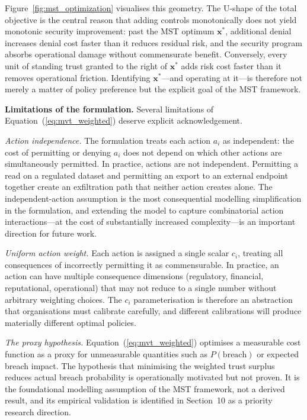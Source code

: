 \documentclass[acmlarge]{acmart}
\begin{document}
Figure~\ref{fig:mst_optimization} visualises this geometry. The U-shape of
the total objective is the central reason that adding controls monotonically
does not yield monotonic security improvement: past the MST optimum
$\mathbf{x}^*$, additional denial increases denial cost faster than it
reduces residual risk, and the security program absorbs operational damage
without commensurate benefit. Conversely, every unit of standing trust
granted to the right of $\mathbf{x}^*$ adds risk cost faster than it removes
operational friction. Identifying $\mathbf{x}^*$---and operating at it---is
therefore not merely a matter of policy preference but the explicit goal of
the MST framework.

\textbf{Limitations of the formulation.}
Several limitations of Equation~(\ref{eq:mvt_weighted}) deserve explicit
acknowledgement.

\textit{Action independence.} The formulation treats each action $a_i$ as
independent: the cost of permitting or denying $a_i$ does not depend on which other
actions are simultaneously permitted. In practice, actions are not independent.
Permitting a read on a regulated dataset and permitting an export to an external
endpoint together create an exfiltration path that neither action creates alone.
The independent-action assumption is the most consequential modelling simplification
in the formulation, and extending the model to capture combinatorial action
interactions---at the cost of substantially increased complexity---is an important
direction for future work.

\textit{Uniform action weight.} Each action is assigned a single scalar $c_i$,
treating all consequences of incorrectly permitting it as commensurable. In
practice, an action can have multiple consequence dimensions (regulatory, financial,
reputational, operational) that may not reduce to a single number without arbitrary
weighting choices. The $c_i$ parameterisation is therefore an abstraction that
organisations must calibrate carefully, and different calibrations will produce
materially different optimal policies.

\textit{The proxy hypothesis.} Equation~(\ref{eq:mvt_weighted}) optimises a
measurable cost function as a proxy for unmeasurable quantities such as
$P(\text{breach})$ or expected breach impact. The hypothesis that minimising
the weighted trust surplus reduces actual breach probability is operationally
motivated but not proven. It is the foundational modelling assumption of the MST
framework, not a derived result, and its empirical validation is identified in
Section~10 as a priority research direction.
\end{document}
